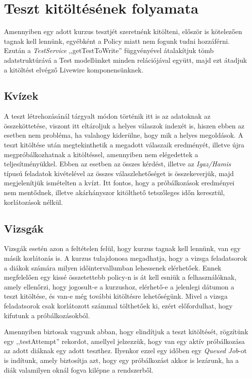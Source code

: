 \documentclass[
]{thesis-ekf}
\theoremstyle{definition}
\theoremstyle{remark}
\begin{document}
            \section{Teszt kitöltésének folyamata}
                 Amennyiben egy adott kurzus tesztjét szeretnénk kitölteni, először is kötelezően tagnak kell lennünk, egyébként a Policy miatt nem fogunk tudni hozzáférni. Ezután a \emph{TestService} ,,getTestToWrite'' függvényével átalakítjuk tömb adatstruktúrává a Test modellünket minden relációjával együtt, majd ezt átadjuk a kitöltést elvégző Livewire komponensünknek.
                \subsection{Kvízek}
                    A teszt létrehozásánál tárgyalt módon történik itt is az adatoknak az összeköttetése, viszont itt eltároljuk a helyes válaszok indexét is, hiszen ebben az esetben nem probléma, ha valahogy kiderülne, hogy mik a helyes megoldások. A teszt kitöltése után megtekinthetik a megadott válaszaik eredményét, illetve újra megpróbálkozhatnak a kitöltéssel, amennyiben nem elégedettek a teljesítményükkel. Ebben az esetben az összes kérdést, illetve az \emph{Igaz/Hamis} típusú feladatok kivételével az összes válaszlehetőséget is összekeverjük, majd megjelenítjük ismételten a kvízt. Itt fontos, hogy a próbálkozások eredményei nem mentődnek, illetve akárhányszor kitölthető tetszőleges időn keresztül, korlátozások nélkül.
                \subsection{Vizsgák}
                    Vizsgák esetén azon a feltételen felül, hogy kurzus tagnak kell lennünk, van egy másik korlátozás is. A kurzus tulajdonosa megadhatja, hogy a vizsga feladatsorok a diákok számára milyen időintervallumban lehessenek elérhetőek. Ennek megfelelően egy kissé összetettebb policy-n is át kell esniük a felhasználóknak, amely ellenőrzi, hogy jogosult-e a kurzushoz, elérhető-e a jelenlegi dátumon a teszt kitöltése, és van-e még további kitöltésre lehetőségünk. Mivel a vizsga feladatsorok csak korlátozott számmal tölthetőek ki, ezért előfordulhat, hogy kifutunk a próbálkozásokból.

                    Amennyiben biztosak vagyunk abban, hogy elindítjuk a teszt kitöltését, rögzítünk egy ,,testAttempt'' rekordot, amellyel jelzezzük, hogy van egy aktív próbálkozása az adott diáknak egy adott teszthez. Ilyenkor ezzel egy időben egy \emph{Queued Job}-ot is indítunk, amely biztosítja azt, hogy egy próbálkozást akkor is lezárunk, ha a diák valamilyen oknál fogva kilépne a rendszerből. 
                    
\end{document}
